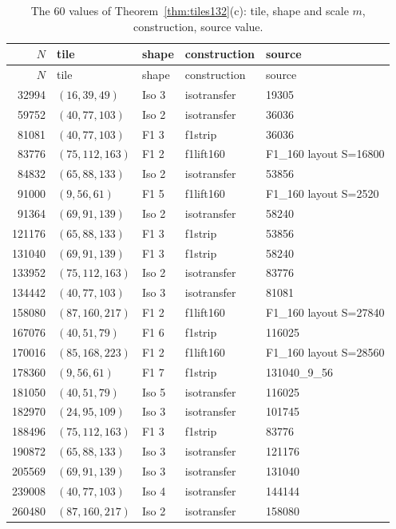 \documentclass[11pt,reqno]{amsart}
\theoremstyle{plain}
\theoremstyle{definition}
\begin{document}
\begin{longtable}{rllll}
\caption{The $60$ values of Theorem~\ref{thm:tiles132}(c): tile, shape and scale $m$, construction, source value.}\label{tab:follow60}\\
\hline $N$ & tile & shape & construction & source\\ \hline\endfirsthead
\hline $N$ & tile & shape & construction & source\\ \hline\endhead
32994 & $(16,39,49)$ & Iso 3 & isotransfer & 19305 \\
59752 & $(40,77,103)$ & Iso 2 & isotransfer & 36036 \\
81081 & $(40,77,103)$ & F1 3 & f1strip & 36036 \\
83776 & $(75,112,163)$ & F1 2 & f1lift160 & F1\_160 layout S=16800 \\
84832 & $(65,88,133)$ & Iso 2 & isotransfer & 53856 \\
91000 & $(9,56,61)$ & F1 5 & f1lift160 & F1\_160 layout S=2520 \\
91364 & $(69,91,139)$ & Iso 2 & isotransfer & 58240 \\
121176 & $(65,88,133)$ & F1 3 & f1strip & 53856 \\
131040 & $(69,91,139)$ & F1 3 & f1strip & 58240 \\
133952 & $(75,112,163)$ & Iso 2 & isotransfer & 83776 \\
134442 & $(40,77,103)$ & Iso 3 & isotransfer & 81081 \\
158080 & $(87,160,217)$ & F1 2 & f1lift160 & F1\_160 layout S=27840 \\
167076 & $(40,51,79)$ & F1 6 & f1strip & 116025 \\
170016 & $(85,168,223)$ & F1 2 & f1lift160 & F1\_160 layout S=28560 \\
178360 & $(9,56,61)$ & F1 7 & f1strip & 131040\_9\_56 \\
181050 & $(40,51,79)$ & Iso 5 & isotransfer & 116025 \\
182970 & $(24,95,109)$ & Iso 3 & isotransfer & 101745 \\
188496 & $(75,112,163)$ & F1 3 & f1strip & 83776 \\
190872 & $(65,88,133)$ & Iso 3 & isotransfer & 121176 \\
205569 & $(69,91,139)$ & Iso 3 & isotransfer & 131040 \\
239008 & $(40,77,103)$ & Iso 4 & isotransfer & 144144 \\
260480 & $(87,160,217)$ & Iso 2 & isotransfer & 158080 \\

\end{longtable}
\end{document}
